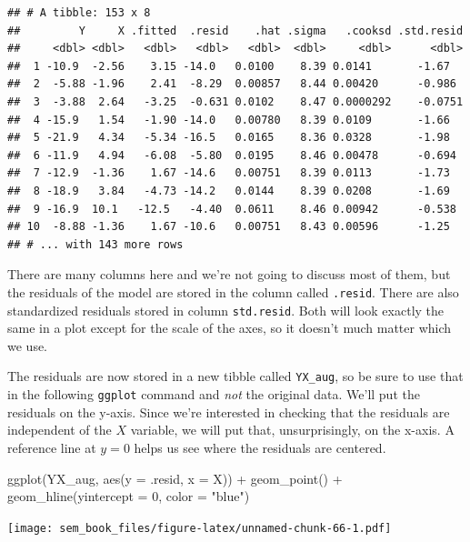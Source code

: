 \documentclass[
]{book}
\newenvironment{Shaded}{\begin{snugshade}}{\end{snugshade}}
\newcommand{\AttributeTok}[1]{\textcolor[rgb]{0.77,0.63,0.00}{#1}}
\newcommand{\DecValTok}[1]{\textcolor[rgb]{0.00,0.00,0.81}{#1}}
\newcommand{\FunctionTok}[1]{\textcolor[rgb]{0.00,0.00,0.00}{#1}}
\newcommand{\NormalTok}[1]{#1}
\newcommand{\SpecialCharTok}[1]{\textcolor[rgb]{0.00,0.00,0.00}{#1}}
\newcommand{\StringTok}[1]{\textcolor[rgb]{0.31,0.60,0.02}{#1}}
\begin{document}
\begin{verbatim}
## # A tibble: 153 x 8
##         Y     X .fitted  .resid    .hat .sigma   .cooksd .std.resid
##     <dbl> <dbl>   <dbl>   <dbl>   <dbl>  <dbl>     <dbl>      <dbl>
##  1 -10.9  -2.56    3.15 -14.0   0.0100    8.39 0.0141       -1.67  
##  2  -5.88 -1.96    2.41  -8.29  0.00857   8.44 0.00420      -0.986 
##  3  -3.88  2.64   -3.25  -0.631 0.0102    8.47 0.0000292    -0.0751
##  4 -15.9   1.54   -1.90 -14.0   0.00780   8.39 0.0109       -1.66  
##  5 -21.9   4.34   -5.34 -16.5   0.0165    8.36 0.0328       -1.98  
##  6 -11.9   4.94   -6.08  -5.80  0.0195    8.46 0.00478      -0.694 
##  7 -12.9  -1.36    1.67 -14.6   0.00751   8.39 0.0113       -1.73  
##  8 -18.9   3.84   -4.73 -14.2   0.0144    8.39 0.0208       -1.69  
##  9 -16.9  10.1   -12.5   -4.40  0.0611    8.46 0.00942      -0.538 
## 10  -8.88 -1.36    1.67 -10.6   0.00751   8.43 0.00596      -1.25  
## # ... with 143 more rows
\end{verbatim}

There are many columns here and we're not going to discuss most of them, but the residuals of the model are stored in the column called \texttt{.resid}. There are also standardized residuals stored in column \texttt{std.resid}. Both will look exactly the same in a plot except for the scale of the axes, so it doesn't much matter which we use.

The residuals are now stored in a new tibble called \texttt{YX\_aug}, so be sure to use that in the following \texttt{ggplot} command and \emph{not} the original data. We'll put the residuals on the y-axis. Since we're interested in checking that the residuals are independent of the \(X\) variable, we will put that, unsurprisingly, on the x-axis. A reference line at \(y = 0\) helps us see where the residuals are centered.

\begin{Shaded}
\begin{Highlighting}[]
\FunctionTok{ggplot}\NormalTok{(YX\_aug, }\FunctionTok{aes}\NormalTok{(}\AttributeTok{y =}\NormalTok{ .resid, }\AttributeTok{x =}\NormalTok{ X)) }\SpecialCharTok{+}
    \FunctionTok{geom\_point}\NormalTok{() }\SpecialCharTok{+}
    \FunctionTok{geom\_hline}\NormalTok{(}\AttributeTok{yintercept =} \DecValTok{0}\NormalTok{, }\AttributeTok{color =} \StringTok{"blue"}\NormalTok{)}
\end{Highlighting}
\end{Shaded}

\texttt{[image: sem\_book\_files/figure-latex/unnamed-chunk-66-1.pdf]}
\end{document}

